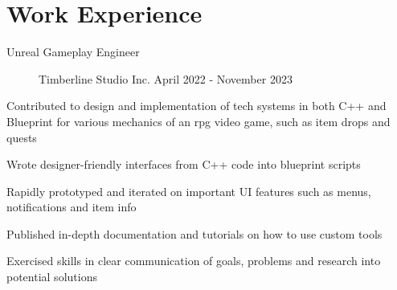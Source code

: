 \documentclass[10pt]{article}
\newenvironment{itemize*}
{\begin{itemize}[leftmargin=*]
    \setlength{\parskip}{0.5pt}}
{\end{itemize}}
\begin{document}
\section*{Work Experience}

\begin{description}
\item[Unreal Gameplay Engineer] Timberline Studio Inc.
    \hfill April 2022 - November 2023
\end{description}
\begin{itemize*}
\item Contributed to design and implementation of tech systems in both C++ and
      Blueprint for various mechanics of an rpg video game, such as item drops
      and quests
\item Wrote designer-friendly interfaces from C++ code into blueprint scripts
\item Rapidly prototyped and iterated on important UI features such as menus,
      notifications and item info
\item Published in-depth documentation and tutorials on how to use custom tools
\item Exercised skills in clear communication of goals, problems and research
      into potential solutions
\end{itemize*}
\end{document}
